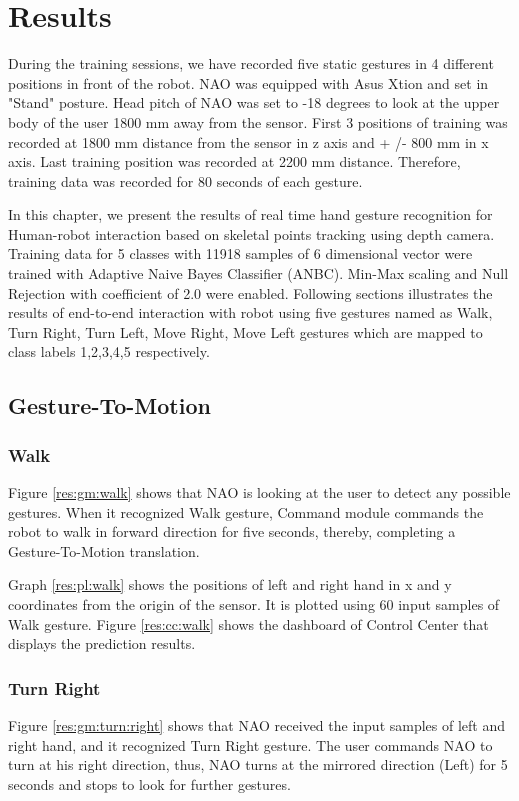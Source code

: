 \chapter{Results}
During the training sessions, we have recorded five static gestures in 4 different positions in front of the robot. NAO was equipped with Asus Xtion and set in "Stand" posture. Head pitch of NAO was set to -18 degrees to look at the upper body of the user 1800 mm away from the sensor. First 3 positions of training was recorded at 1800 mm distance from the sensor in z axis and + /- 800 mm in x axis. Last training position was recorded at 2200 mm distance. Therefore, training data was recorded for 80 seconds of each gesture.

In this chapter, we present the results of real time hand gesture recognition for Human-robot interaction based on skeletal points tracking using depth camera. Training data for 5 classes with 11918 samples of 6 dimensional vector were trained with Adaptive Naive Bayes Classifier (ANBC). Min-Max scaling and Null Rejection with coefficient of 2.0 were enabled. Following sections illustrates the results of end-to-end interaction with robot using five gestures named as  Walk, Turn Right, Turn Left, Move Right, Move Left gestures which are mapped to class labels 1,2,3,4,5 respectively.

\section{Gesture-To-Motion}
\subsection{Walk} Figure \ref{res:gm:walk} shows that NAO is looking at the user to detect any possible gestures. When it recognized Walk gesture, Command module commands the robot to walk in forward direction for five seconds, thereby, completing a Gesture-To-Motion translation.



Graph \ref{res:pl:walk} shows the positions of left and right hand in x and y coordinates from the origin of the sensor. It is plotted using 60 input samples of Walk gesture. Figure \ref{res:cc:walk} shows the dashboard of Control Center that displays the prediction results. 

\clearpage
\subsection{Turn Right}
 Figure \ref{res:gm:turn:right} shows that NAO received the input samples of left and right hand, and it recognized Turn Right gesture. The user commands NAO to turn at his right direction, thus, NAO turns at the mirrored direction (Left) for 5 seconds and stops to look for further gestures.

